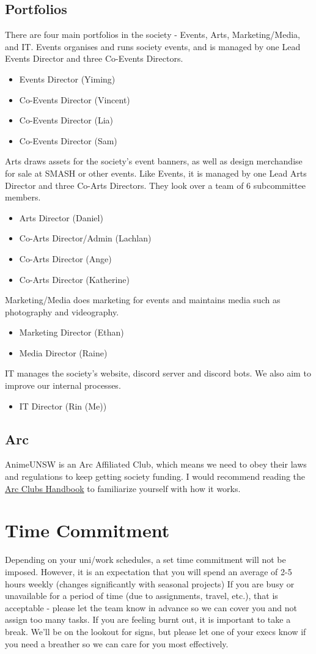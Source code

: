 \documentclass{article}
\begin{document}
\subsection{Portfolios}
There are four main portfolios in the society - Events, Arts, Marketing/Media, and IT.
Events organises and runs society events, and is managed by one Lead Events Director and three Co-Events Directors.
\begin{itemize}
\item Events Director (Yiming)
\item Co-Events Director (Vincent)
\item Co-Events Director (Lia)
\item Co-Events Director (Sam)
\end{itemize}
Arts draws assets for the society’s event banners, as well as design merchandise for sale at SMASH or other events. Like Events, it is managed by one Lead Arts Director and three Co-Arts Directors. They look over a team of 6 subcommittee members.
\begin{itemize}
\item Arts Director (Daniel)
\item Co-Arts Director/Admin (Lachlan)
\item Co-Arts Director (Ange)
\item Co-Arts Director (Katherine)
\end{itemize}
Marketing/Media does marketing for events and maintains media such as photography and videography.
\begin{itemize}
\item Marketing Director (Ethan)
\item Media Director (Raine)
\end{itemize}
IT manages the society's website, discord server and discord bots. We also aim to improve our internal processes.
\begin{itemize}
\item IT Director (Rin (Me))
\end{itemize}
\subsection{Arc}
AnimeUNSW is an Arc Affiliated Club, which means we need to obey their laws and regulations to keep getting society funding. I would recommend reading the \href{https://www.arc.unsw.edu.au/clubs/clubshandbook}{Arc Clubs Handbook} to familiarize yourself with how it works.
\section{Time Commitment}
Depending on your uni/work schedules, a set time commitment will not be imposed. However, it is an expectation that you will spend an average of 2-5 hours weekly (changes significantly with seasonal projects)
If you are busy or unavailable for a period of time (due to assignments, travel, etc.), that is acceptable - please let the team know in advance so we can cover you and not assign too many tasks.
If you are feeling burnt out, it is important to take a break. We’ll be on the lookout for signs, but please let one of your execs know if you need a breather so we can care for you most effectively.
\end{document}
